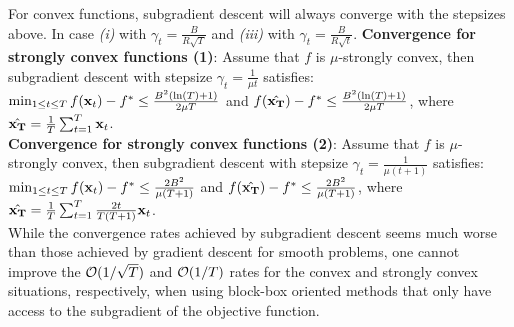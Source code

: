 For convex functions, subgradient descent will always converge with the stepsizes above. In case \textit{(i)} with $\gamma_t = \frac{B}{R\sqrt{T}}$ and \textit{(iii)} with $\gamma_t = \frac{B}{R\sqrt{t}}$.
\textbf{Convergence for strongly convex functions (1)}: Assume that $f$ is $\mu$-strongly convex, then subgradient descent with stepsize $\gamma_t = \frac{1}{\mu t}$ satisfies: $\min_{1\leq t \leq T}{f(\mathbf{x}_t) - f^*} \leq \frac{B^2(\ln(T) + 1)}{2 \mu T}$ and $f(\hat{\mathbf{x}_T}) - f^* \leq \frac{B^2(\ln(T)+1)}{2\mu T}$, where $\hat{\mathbf{x}_T} = \frac{1}{T}\sum_{t=1}^T{\mathbf{x}_t}$. \\
\textbf{Convergence for strongly convex functions (2)}: Assume that $f$ is $\mu$-strongly convex, then subgradient descent with stepsize $\gamma_t = \frac{1}{\mu (t+1)}$ satisfies: $\min_{1\leq t \leq T}{f(\mathbf{x}_t) - f^*} \leq \frac{2B^2}{\mu(T+1)}$ and $f(\hat{\mathbf{x}_T}) - f^* \leq \frac{2B^2}{\mu(T+1)}$, where $\hat{\mathbf{x}_T} = \frac{1}{T}\sum_{t=1}^T{\frac{2t}{T(T+1)}\mathbf{x}_t}$. \\
While the convergence rates achieved by subgradient descent seems much worse than those achieved by gradient descent for smooth problems, one cannot improve the $\mathcal{O}(1 / \sqrt{T})$ and $\mathcal{O}(1 / T)$ rates for the convex and strongly convex situations, respectively, when using block-box oriented methods that only have access to the subgradient of the objective function. \\
